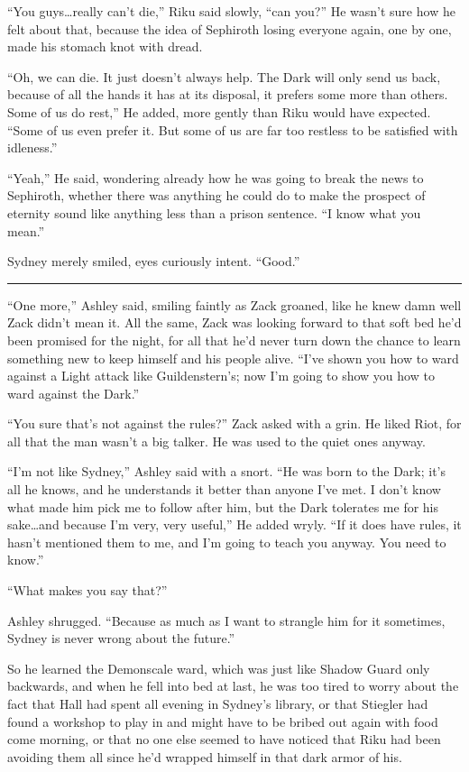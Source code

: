 ``You guys\ldots really can't die,'' Riku said slowly, ``can you?'' He wasn't sure how he felt about that, because the idea of Sephiroth losing everyone again, one by one, made his stomach knot with dread.

``Oh, we can die. It just doesn't always help. The Dark will only send us back, because of all the hands it has at its disposal, it prefers some more than others. Some of us do rest,'' He added, more gently than Riku would have expected. ``Some of us even prefer it. But some of us are far too restless to be satisfied with idleness.''

``Yeah,'' He said, wondering already how he was going to break the news to Sephiroth, whether there was anything he could do to make the prospect of eternity sound like anything less than a prison sentence. ``I know what you mean.''

Sydney merely smiled, eyes curiously intent. ``Good.''

\fancybreak{\pfbreakdisplay}


``One more,'' Ashley said, smiling faintly as Zack groaned, like he knew damn well Zack didn't mean it. All the same, Zack was looking forward to that soft bed he'd been promised for the night, for all that he'd never turn down the chance to learn something new to keep himself and his people alive. ``I've shown you how to ward against a Light attack like Guildenstern's; now I'm going to show you how to ward against the Dark.''

``You sure that's not against the rules?'' Zack asked with a grin. He liked Riot, for all that the man wasn't a big talker. He was used to the quiet ones anyway.

``I'm not like Sydney,'' Ashley said with a snort. ``He was born to the Dark; it's all he knows, and he understands it better than anyone I've met. I don't know what made him pick me to follow after him, but the Dark tolerates me for his sake\ldots and because I'm very, very useful,'' He added wryly. ``If it does have rules, it hasn't mentioned them to me, and I'm going to teach you anyway. You need to know.''

``What makes you say that?''

Ashley shrugged. ``Because as much as I want to strangle him for it sometimes, Sydney is never wrong about the future.''

So he learned the Demonscale ward, which was just like Shadow Guard only backwards, and when he fell into bed at last, he was too tired to worry about the fact that Hall had spent all evening in Sydney's library, or that Stiegler had found a workshop to play in and might have to be bribed out again with food come morning, or that no one else seemed to have noticed that Riku had been avoiding them all since he'd wrapped himself in that dark armor of his.

